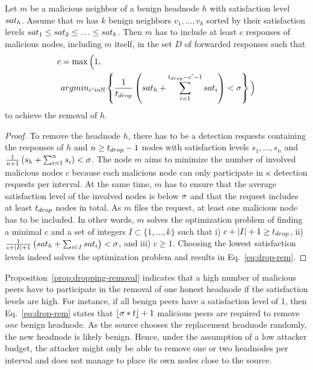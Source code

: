 \begin{proposition}
\label{prop:dropping-removal}
Let $m$ be a malicious neighbor of a benign headnode $h$ with satisfaction level $sat_h$. Assume that $m$ has $k$ benign neighbors $v_1, \ldots , v_k$ sorted by their satisfaction levels $sat_1 \leq sat_2 \leq \ldots  \leq sat_k$. 
Then $m$ has to include at least $c$ responses of malicious nodes, including $m$ itself, in the set $D$ of forwarded responses such that
\begin{align}
\label{eq:drop-rem}
\begin{split}
c &= \max \Big( 1,  \\
 & argmin_{c' in \mathbb{N}} 
\left\lbrace \frac{1}{\minP}\left(\sat_h+\sum_{i=1}^{\minP-c'-1}\sat_i \right) < \satThres \right\rbrace 
\Big)
\end{split}
\end{align}
to achieve the removal of $h$. 
\end{proposition}
\begin{proof}
To remove the headnode $h$, there has to be a detection requests containing the responses of $h$ and $n\geq t_{drop}-1$ nodes with satisfaction levels $s_1, \ldots , s_n$ and 
$\frac{1}{n+1}\left( s_h + \sum_{i=1}^{n}s_i \right) < \sigma$.
The node $m$ aims to minimize the number of involved malicious nodes $c$ because each malicious node can only participate in $\kappa$ detection requests per interval. At the same time, $m$ has to ensure that the average satisfaction level of the involved nodes is below $\sigma$ and that the request includes at least $t_{drop}$ nodes in total. As $m$ files the request, at least one malicious node has to be included. 
In other words, $m$ solves the optimization problem of finding a minimal $c$ and a set of integers $I \subset \{1, \ldots, k\}$ such that i) $c + |I|+1 \geq t_{drop}$, ii) $\frac{1}{c + |I|+1}\left( sat_h + \sum_{i \in I} sat_i \right) < \sigma$, and iii) $c\geq 1$. 
Choosing the lowest satisfaction levels indeed solves the optimization problem and results in Eq.~\ref{eq:drop-rem}. 
\end{proof}

Proposition~\ref{prop:dropping-removal} indicates that a high number of malicious peers have to participate in the removal of one honest headnode if the satisfaction levels are high. 
For instance, if all benign peers have a satisfaction level of 1, then Eq.~\ref{eq:drop-rem} states that $\lfloor \sigma*t \rfloor +1$ malicious peers are required to remove \emph{one} benign headnode. As the source chooses the replacement headnode  randomly, the new headnode is likely benign. Hence, under the assumption of a low attacker budget, the attacker might only be able to remove one or two headnodes per interval and does not manage to place its own nodes close to the source. 

